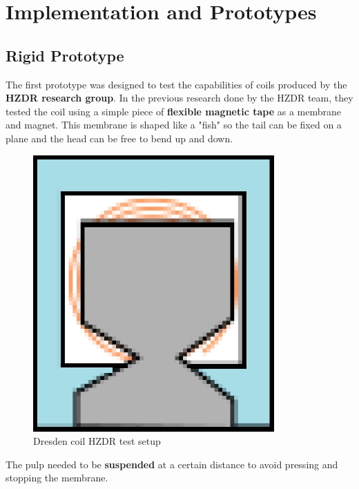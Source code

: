 \section{Implementation and Prototypes}
\subsection{Rigid Prototype}
The first prototype was designed to test the capabilities of coils produced by the \textbf{HZDR research group}.
In the previous research done by the HZDR team, they tested the coil using a simple piece of \textbf{flexible magnetic tape} as a membrane and magnet.
This membrane is shaped like a "fish" so the tail can be fixed on a plane and the head can be free to bend up and down.
\begin{figure}[H]
    \centering
    \includegraphics[width = 0.2\linewidth]{Figures/Dresden_test.png}
    \caption{Dresden coil HZDR test setup}
    \label{fig: Dresden_test}
\end{figure}
The pulp needed to be \textbf{suspended} at a certain distance to avoid pressing and stopping the membrane.

